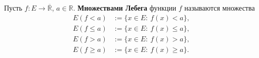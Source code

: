 \label{definition:22}

\begin{definition}
Пусть $f:E\to\overline{\mathbb R}$, $a\in\mathbb R$.
\textbf{Множествами Лебега} функции $f$ называются множества
\[
  \begin{aligned}
    E(f<a)&:=\{x\in E:\ f(x)<a\},\\
    E(f\le a)&:=\{x\in E:\ f(x)\le a\},\\
    E(f>a)&:=\{x\in E:\ f(x)>a\},\\
    E(f\ge a)&:=\{x\in E:\ f(x)\ge a\}.
  \end{aligned}
\]
\end{definition}
